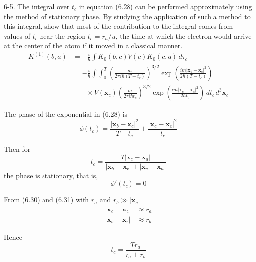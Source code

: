 \documentclass[12pt]{article}
\begin{document}
6-5.
The integral over $t_c$ in equation (6.28) can be performed
approximately using the method of stationary phase.
By studying the application of such a method to this integral,
show that most of the contribution to the integral comes from
values of $t_c$ near the region $t_c=r_a/u$, the time at which
the electron would arrive at the center of the atom if it
moved in a classical manner.
\begin{align*}
K^{(1)}(b,a)&=-\frac{i}{\hbar}\int K_0(b,c)V(c)K_0(c,a)\,d\tau_c
\\
&=-\frac{i}{\hbar}\int\int_0^T
\left(\frac{m}{2\pi i\hbar(T-t_c)}\right)^{3/2}
\exp\left(\frac{im|\mathbf x_b-\mathbf x_c|^2}{2\hbar(T-t_c)}\right)
\\
&\qquad{}\times
V(\mathbf x_c)
\left(\frac{m}{2\pi i\hbar t_c}\right)^{3/2}
\exp\left(\frac{im|\mathbf x_c-\mathbf x_a|^2}{2\hbar t_c}\right)
\,dt_c\,d^3\mathbf x_c
\tag{6.28}
\end{align*}

The phase of the exponential in (6.28) is
\begin{equation*}
\phi(t_c)=
\frac{|\mathbf x_b-\mathbf x_c|^2}{T-t_c}
+
\frac{|\mathbf x_c-\mathbf x_a|^2}{t_c}
\end{equation*}

Then for
\begin{equation*}
t_c=\frac{T|\mathbf x_c-\mathbf x_a|}{|\mathbf x_b-\mathbf x_c|+|\mathbf x_c-\mathbf x_a|}
\end{equation*}
the phase is stationary, that is,
\begin{equation*}
\phi'(t_c)=0
\end{equation*}

From (6.30) and (6.31) with $r_a$ and $r_b\gg|\mathbf x_c|$
\begin{align*}
|\mathbf x_c-\mathbf x_a|&\approx r_a %
\\
|\mathbf x_b-\mathbf x_c|&\approx r_b %
\end{align*}

Hence
\begin{equation*}
t_c=\frac{Tr_a}{r_a+r_b}
\end{equation*}
\end{document}
